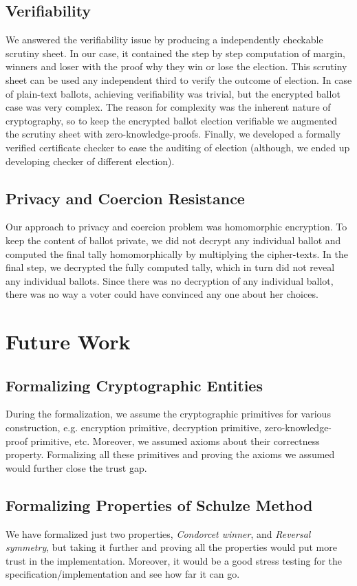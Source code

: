 \subsection{Verifiability}
We answered the verifiability issue by producing a 
independently checkable scrutiny sheet. In our case, 
it contained the step by step computation of margin, 
winners and loser with the proof why they win or 
lose the election. This scrutiny 
sheet can be used any independent third to verify the 
outcome of election. In case of plain-text ballots, 
achieving verifiability was trivial, but the encrypted 
ballot case was very complex. The reason 
for complexity was the inherent nature of cryptography, 
so to keep the encrypted ballot election verifiable 
we augmented the scrutiny sheet with zero-knowledge-proofs. 
Finally, we developed a formally verified certificate checker to ease the 
auditing of election (although, we ended up developing 
checker of different election). 

\subsection{Privacy and Coercion Resistance}
Our approach to privacy and coercion problem was homomorphic encryption. 
To keep the content of ballot private, we did not decrypt
any individual ballot and computed the final tally homomorphically 
by multiplying the cipher-texts. In the final step, we decrypted 
the fully computed tally, which 
in turn did not reveal any individual ballots.  Since there 
was no decryption of any individual ballot, there was 
no way a voter could have convinced any one about her 
choices. 


\section{Future Work}
\label{sec:future}
\subsection{Formalizing Cryptographic Entities}
During the formalization, we assume the cryptographic primitives 
for various construction, e.g. encryption primitive, decryption primitive,
zero-knowledge-proof primitive, etc. Moreover,  
we assumed axioms about their correctness property. 
Formalizing all these primitives and proving the 
axioms we assumed would further close the trust 
gap.  


\subsection{Formalizing Properties of Schulze Method}
We have formalized just two properties, 
\textit{Condorcet winner}, and \textit{Reversal symmetry},
but taking it further and proving all the properties 
would put more trust in the implementation. Moreover, 
it would be a good stress testing for the specification/implementation 
and see how far it can go. 

